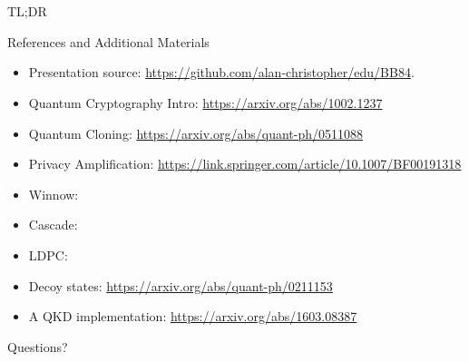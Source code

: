 \documentclass[pdf]{beamer}
\makeatletter
\def\beamer@writeslidentry@miniframesoff{%
  \expandafter\beamer@ifempty\expandafter{\beamer@framestartpage}{}%
  {%
    \clearpage\beamer@notesactions%
  }
}
\newcommand*{\miniframesoff}{\let\beamer@writeslidentry=\beamer@writeslidentry@miniframesoff}
\makeatother
\begin{document}
\miniframesoff
\section*{}
\begin{frame}{TL;DR}
\end{frame}

\begin{frame}{References and Additional Materials}
  \begin{itemize}
  \item Presentation source:
    \url{https://github.com/alan-christopher/edu/BB84}.
  \item Quantum Cryptography Intro: \url{https://arxiv.org/abs/1002.1237}
  \item Quantum Cloning: \url{https://arxiv.org/abs/quant-ph/0511088}
  \item Privacy Amplification: \url{https://link.springer.com/article/10.1007/BF00191318}
  \item Winnow: \url{}
  \item Cascade: \url{}
  \item LDPC: \url{}
  \item Decoy states: \url{https://arxiv.org/abs/quant-ph/0211153} %
  \item A QKD implementation: \url{https://arxiv.org/abs/1603.08387}
  \end{itemize}
\end{frame}

\begin{frame}{Questions?}
\end{frame}
\end{document}
